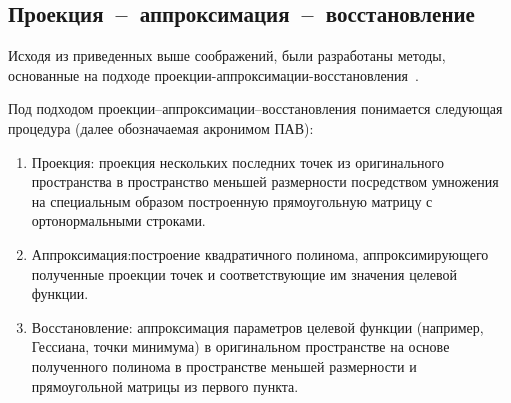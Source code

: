 \subsection{Проекция~--~аппроксимация~--~восстановление}

Исходя из приведенных выше соображений, были разработаны методы, основанные на подходе проекции-аппроксимации-восстановления~\cite{pav, senov}. 

Под подходом проекции–аппроксимации–восстановления понимается следующая процедура (далее обозначаемая акронимом
ПАВ):

\begin{enumerate}
    \item Проекция: проекция нескольких последних точек из оригинального пространства в пространство меньшей размерности посредством умножения на специальным образом построенную прямоугольную матрицу с ортонормальными строками.
    \item Аппроксимация:построение квадратичного полинома, аппроксимирующего полученные проекции точек и соответствующие им значения целевой функции. 
    \item Восстановление: аппроксимация параметров целевой функции (например, Гессиана, точки минимума) в оригинальном пространстве на основе полученного полинома в пространстве меньшей размерности и прямоугольной матрицы из первого пункта.
\end{enumerate}